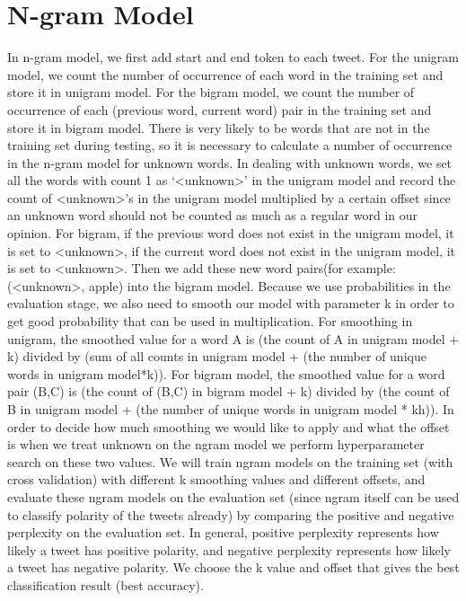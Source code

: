 \documentclass[a4paper]{article}
\begin{document}
\section{N-gram Model}
\begin{flushleft}
In n-gram model, we first add start and end token to each tweet. For the unigram model, we count the number of occurrence of each word in the training set and store it in unigram model. For the bigram model, we count the number of occurrence of each (previous word, current word) pair in the training set and store it in bigram model. There is very likely to be words that are not in the training set during testing, so it is necessary to calculate a number of occurrence in the n-gram model for unknown words. In dealing with unknown words, we set all the words with count 1 as ‘<unknown>’ in the unigram model and record the count of <unknown>’s in the unigram model multiplied by a certain offset since an unknown word should not be counted as much as a regular word in our opinion. For bigram, if the previous word does not exist in the unigram model, it is set to <unknown>, if the current word does not exist in the unigram model, it is set to <unknown>. Then we add these new word pairs(for example: (<unknown>, apple) into the bigram model.  Because we use probabilities in the evaluation stage, we also need to smooth our model with parameter k in order to get good probability that can be used in multiplication. For smoothing in unigram, the smoothed value for a word A is (the count of A in unigram model + k) divided by (sum of all counts in unigram model + (the number of unique words in unigram model*k)). For bigram model, the smoothed value for a word pair (B,C) is (the count of (B,C) in bigram model + k) divided by (the count of B in unigram model + (the number of unique words in unigram model * kh)). In order to decide how much smoothing we would like to apply and what the offset is when we treat unknown on the ngram model we perform hyperparameter search on these two values. We will train ngram models on the training set (with cross validation) with different k smoothing values and different offsets, and evaluate these ngram models on the evaluation set (since ngram itself can be used to classify polarity of the tweets already) by comparing the positive and negative perplexity on the evaluation set. In general, positive perplexity represents how likely a tweet has positive polarity, and negative perplexity represents how likely a tweet has negative polarity. We choose the k value and offset that gives the best classification result (best accuracy).
\end{flushleft}
\end{document}
